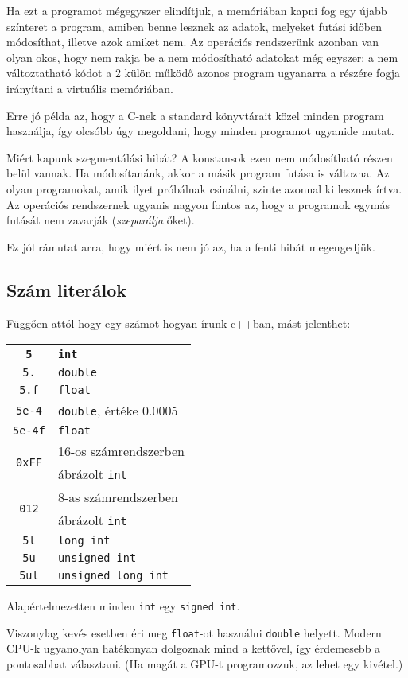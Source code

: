 \documentclass[a4paper,11.5pt,table]{article}
\begin{document}
	Ha ezt a programot mégegyszer elindítjuk, a memóriában kapni fog egy újabb színteret a program, amiben benne lesznek az adatok, melyeket futási időben módosíthat, illetve azok amiket nem. Az operációs rendszerünk azonban van olyan okos, hogy nem rakja be a nem módosítható adatokat még egyszer: a nem változtatható kódot a 2 külön működő azonos program ugyanarra a részére fogja irányítani a virtuális memóriában.
	
	\medskip
	Erre jó példa az, hogy a C-nek a standard könyvtárait közel minden program használja, így olcsóbb úgy megoldani, hogy minden programot ugyanide mutat.
	
	\medskip
	Miért kapunk szegmentálási hibát? A konstansok ezen nem módosítható részen belül vannak. Ha módosítanánk, akkor a másik program futása is változna. Az olyan programokat, amik ilyet próbálnak csinálni, szinte azonnal ki lesznek írtva. Az operációs rendszernek ugyanis nagyon fontos az, hogy a programok egymás futását nem zavarják (\textit{szeparálja} őket).
	
	\medskip
	Ez jól rámutat arra, hogy miért is nem jó az, ha a fenti hibát megengedjük.
	\subsection{Szám literálok} %
	Függően attól hogy egy számot hogyan írunk c++ban, mást jelenthet:
	\begin{center}
		\setlength{\extrarowheight}{2pt}
		\begin{tabular}{|c|l|}
			\hline
			\texttt{5}						&\texttt{int}\\
			\hline
			\texttt{5.}						&\texttt{double}\\
			\hline
			\texttt{5.f}					&\texttt{float}\\
			\hline
			\texttt{5e-4}					&\texttt{double}, értéke 0.0005\\
			\hline
			\texttt{5e-4f}					&\texttt{float}\\
			\hline
			\multirow{2}{*}{\texttt{0xFF}}	&{16-os számrendszerben}\\
											& ábrázolt \texttt{int}\\
			\hline
			\multirow{2}{*}{\texttt{012}}	&{8-as számrendszerben}\\
											&ábrázolt \texttt{int}\\
			\hline
			\texttt{5l}						&\texttt{long int}\\
			\hline
			\texttt{5u}						&\texttt{unsigned int}\\
			\hline
			\texttt{5ul}					&\texttt{unsigned long int}\\
			\hline
		\end{tabular}
		\end{center}
	\begin{note}
		Alapértelmezetten minden \texttt{int} egy \texttt{signed int}.
	\end{note}
	\begin{note}
		Viszonylag kevés esetben éri meg \texttt{float}-ot használni \texttt{double} helyett. Modern CPU-k ugyanolyan hatékonyan dolgoznak mind a kettővel, így érdemesebb a pontosabbat választani. (Ha magát a GPU-t programozzuk, az lehet egy kivétel.)
	\end{note}
	
\end{document}
